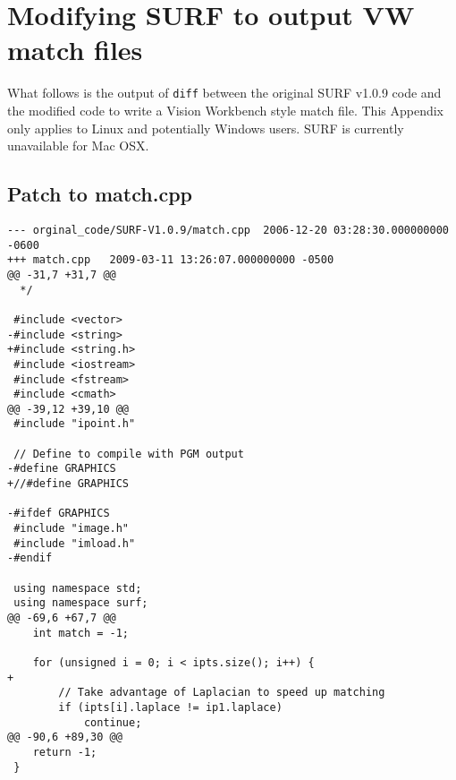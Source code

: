 \chapter{Modifying SURF to output VW match files}

What follows is the output of \texttt{diff} between the original SURF
v1.0.9 code and the modified code to write a Vision Workbench style
match file. This Appendix only applies to Linux and potentially
Windows users. SURF is currently unavailable for Mac OSX.

\section{Patch to match.cpp}

\begin{verbatim}
--- orginal_code/SURF-V1.0.9/match.cpp	2006-12-20 03:28:30.000000000 -0600
+++ match.cpp	2009-03-11 13:26:07.000000000 -0500
@@ -31,7 +31,7 @@
  */
 
 #include <vector>
-#include <string>
+#include <string.h>
 #include <iostream>
 #include <fstream>
 #include <cmath>
@@ -39,12 +39,10 @@
 #include "ipoint.h"
 
 // Define to compile with PGM output
-#define GRAPHICS
+//#define GRAPHICS
 
-#ifdef GRAPHICS
 #include "image.h"
 #include "imload.h"
-#endif
 
 using namespace std;
 using namespace surf;
@@ -69,6 +67,7 @@
 	int match = -1;
 
 	for (unsigned i = 0; i < ipts.size(); i++) {
+
 		// Take advantage of Laplacian to speed up matching
 		if (ipts[i].laplace != ip1.laplace)
 			continue;
@@ -90,6 +89,30 @@
 	return -1;
 }
 

\end{verbatim}
